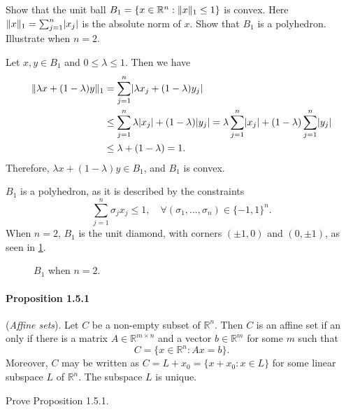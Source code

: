 \begin{exercise}
  Show that the unit ball $B_1 = \{ x \in \mathbb{R}^n : \lVert x\rVert_1 \leq 1 \}$ is convex.
  Here $\lVert x\rVert_1 = \sum_{j=1}^n \lvert x_j\rvert$ is the absolute norm of $x$.
  Show that $B_1$ is a polyhedron.
  Illustrate when $n = 2$.
\end{exercise}

\begin{solution}
  Let $x, y \in B_1$ and $0 \leq \lambda \leq 1$.
  Then we have
  \begin{equation}
    \begin{split}
      \lVert\lambda x + (1 - \lambda) y\rVert_1
      &= \sum_{j=1}^n \lvert\lambda x_j + (1 - \lambda) y_j\rvert \\
      &\leq \sum_{j=1}^n \lambda \lvert x_j\rvert + (1 - \lambda) \lvert y_j\rvert
      = \lambda \sum_{j=1}^n \lvert x_j\rvert + (1 - \lambda)\sum_{j=1}^n \lvert y_j\rvert \\
      &\leq \lambda + (1 - \lambda) = 1.
    \end{split}
  \end{equation}
  Therefore, $\lambda x + (1 - \lambda) y \in B_1$, and $B_1$ is convex.

  $B_1$ is a polyhedron, as it is described by the constraints
  \begin{equation}
    \sum_{j = 1}^{n} \sigma_j x_j \leq 1, \quad \forall (\sigma_1, \ldots, \sigma_n) \in \{-1, 1\}^n.
  \end{equation}
  When $n = 2$, $B_1$ is the unit diamond, with corners $(\pm 1, 0)$ and $(0, \pm 1)$, as seen in \cref{fig:unit_diamond}.

  \begin{figure}[htbp]
    \centering
    \resizebox{0.4\textwidth}{!}{
      
    }
    \caption{$B_1$ when $n = 2$.\label{fig:unit_diamond}}
  \end{figure}
\end{solution}

\paragraph{Proposition 1.5.1} (\emph{Affine sets}).
Let $C$ be a non-empty subset of $\mathbb{R}^n$.
Then $C$ is an affine set if an only if there is a matrix $A \in \mathbb{R}^{m \times n}$ and a vector $b \in \mathbb{R}^m$ for some $m$ such that
\begin{equation}
  C = \{ x \in \mathbb{R}^n : Ax = b \}.
\end{equation}
Moreover, $C$ may be written as $C = L + x_0 = \{ x + x_0 : x \in L \}$ for some linear subspace $L$ of $\mathbb{R}^n$.
The subspace $L$ is unique.

\begin{exercise}
  Prove Proposition 1.5.1.
\end{exercise}